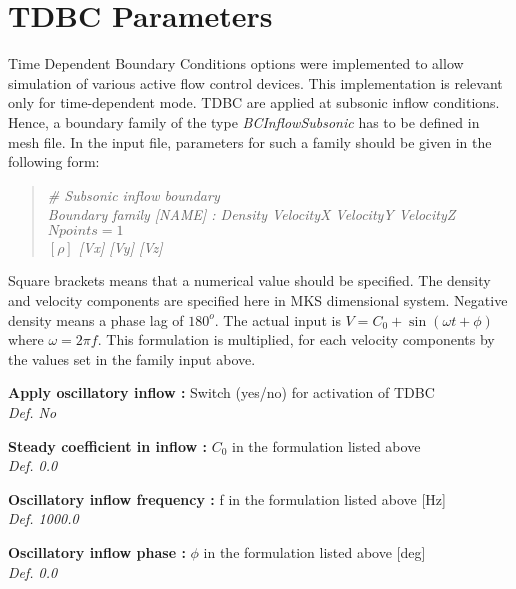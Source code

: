 \documentclass[12pt,epsf,colordvi]{article}
\begin{document}
\section{ TDBC Parameters}  \label{sec:tdbc}
%
Time Dependent Boundary Conditions options were implemented to allow simulation of various active flow control devices. This implementation is relevant only for time-dependent mode. TDBC are applied at subsonic inflow conditions. Hence, a boundary family of the type {\it BCInflowSubsonic } has to be defined in mesh file. In the input file, parameters for such a family should be given in the following form:
\begin{verse}
      { \it \# Subsonic inflow  boundary  \\
Boundary family [NAME] : Density VelocityX VelocityY VelocityZ \\
            \(Npoints = 1 \)\\
            \([\rho]\) [Vx]     [Vy]     [Vz]  }
\end{verse}
Square brackets means that a numerical value should be specified. The density and velocity components are specified here in MKS dimensional system. Negative density means a phase lag of \(180^o\). The actual input is \(V=C_0 + \sin ( \omega t + \phi ) \) where \(\omega= 2\pi f\). This formulation is multiplied, for each velocity components by the values set in the family input above.
%
\begin{description}
%
      \item{\bf  Apply oscillatory inflow :} Switch (yes/no) for activation of TDBC \\
{\it Def.  No}
%
 \item{\bf Steady coefficient in inflow :} \(C_0\) in the formulation listed above \\
{\it Def.  0.0 }
%
  \item{\bf Oscillatory inflow frequency  : } f in the formulation listed above [Hz] \\
{\it Def.  1000.0 }
%
\item{\bf  Oscillatory inflow phase  :} \(\phi\) in the formulation listed above [deg] \\
{\it Def.  0.0  }
%
\end{description}
%
%
\noindent
\end{document}
